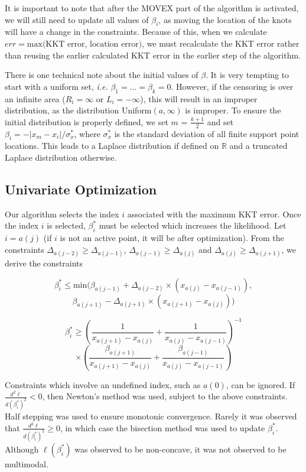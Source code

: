 	It is important to note that after the MOVEX part of the algorithm is activated, we will still need to update all values of $\beta_i$, as moving the location of the knots will have a change in the constraints. Because of this, when we calculate $err = \text{max(KKT error, location error)}$, we must recalculate the KKT error rather than reusing the earlier calculated KKT error in the earlier step of the algorithm. 
	
	There is one technical note about the initial values of $\beta$. It is very tempting to start with a uniform set, \emph{i.e.} $\beta_1 = ... = \beta_k = 0$. However, if the censoring is over an infinite area ($R_i = \infty$ or $L_i = -\infty$), this will result in an improper distribution, as the distribution Uniform$(a, \infty)$ is improper. To ensure the initial distribution is properly defined, we set $m$ = $\frac{k + 1} {2}$ and set $\beta_i = -|x_m - x_i | / \sigma_x^*$, where $\sigma_x^*$ is the standard deviation of all finite support point locations. This leads to a Laplace distribution if defined on $\mathbb{R}$ and a truncated Laplace distribution otherwise.	
	{\subsection{Univariate Optimization}} 
	
	Our algorithm selects the index $i$ associated with the maximum KKT error. Once the index $i$ is selected, $\beta_i^*$ must be selected which increases the likelihood. Let $i = a(j)$ (if $i$ is not an active point, it will be after optimization). From the constraints $\Delta_{a(j-2)} \geq \Delta_{a(j-1)}$, $\Delta_{a(j-1)} \geq \Delta_{a(j)}$ and $\Delta_{a(j)} \geq \Delta_{a(j+1)}$, we derive the constraints
	
	\[
	 \beta_i^* \leq \text{min} (\beta_{a(j-1)} + \Delta_{a(j-2)} \times (x_{a(j)} - x_{a(j-1)}),
	 \]
	 \[
	 \beta_{a(j+1)} -\Delta_{a(j+1)} \times (x_{a(j+1)} - x_{a(j)}) ) 
	\]
	
	\[
	 \beta_i^* \geq \left(\frac{1}{x_{a(j+1)} - x_{a(j)}} +  \frac{1}{x_{a(j)} - x_{a(j-1)} } \right)^{-1} 
	\]
	\[
	\times \left(\frac{\beta_{a(j+1)} } { x_{a(j+1)} - x_{a(j)}} + \frac{\beta_{a(j-1)}} {x_{a(j)} - x_{a(j-1)} } \right)
	\]
	
	Constraints which involve an undefined index, such as $a(0)$, can be ignored. If $\frac{d^2 \ell} {d (\beta^*_{i})^2 } < 0$, then Newton's method was used, subject to the above constraints. Half stepping was used to ensure monotonic convergence. Rarely it was observed that $\frac{d^2 \ell} {d (\beta^*_{i}) ^2 } \geq 0$, in which case the bisection method was used to update $\beta^*_i$. Although $\ell(\beta^*_i)$ was observed to be non-concave, it was not observed to be multimodal.
	
